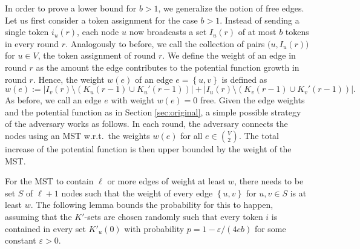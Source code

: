 \documentclass{llncs}
\newcommand{\set}[1]{\left\{#1\right\}}
\newcommand{\eps}{\varepsilon}
\begin{document}
In order to prove a lower bound for $b>1$, we generalize the notion of
free edges. Let us first consider a token assignment for the case
$b>1$. Instead of sending a single token $i_u(r)$, each node $u$ now
broadcasts a set $I_u(r)$ of at most $b$ tokens in every round
$r$. Analogously to before, we call the collection of pairs
$\big(u,I_u(r)\big)$ for $u\in V$, the token assignment of round
$r$. We define the weight of an edge in round $r$ as the amount the
edge contributes to the potential function growth in round $r$. Hence,
the weight $w(e)$ of an edge $e=\set{u,v}$ is defined as
\begin{equation}
    \label{eq:edgeweight}
    w(e) := \left|I_v(r)\setminus (K_u(r\!-\!1)\cup K_u'(r\!-\!1))\right| + 
    \left|I_u(r)\setminus (K_v(r\!-\!1)\cup K_v'(r\!-\!1))\right|.
\end{equation}
As before, we call an edge $e$ with weight $w(e)=0$ free. Given the
edge weights and the potential function as in Section
\ref{sec:original}, a simple possible strategy of the adversary works
as follows. In each round, the adversary connects the nodes using an
MST w.r.t.\ the weights $w(e)$ for all $e\in {V\choose 2}$. The total
increase of the potential function is then upper bounded by the weight
of the MST.

For the MST to contain $\ell$ or more edges of weight at least $w$,
there needs to be set $S$ of $\ell+1$ nodes such that the weight of
every edge $\set{u,v}$ for $u,v\in S$ is at least $w$. The following
lemma bounds the probability for this to happen, assuming that the
$K'$-sets are chosen randomly such that every token $i$ is contained
in every set $K'_u(0)$ with probability $p=1-\eps/(4eb)$ for some
constant $\eps>0$. 
\end{document}
